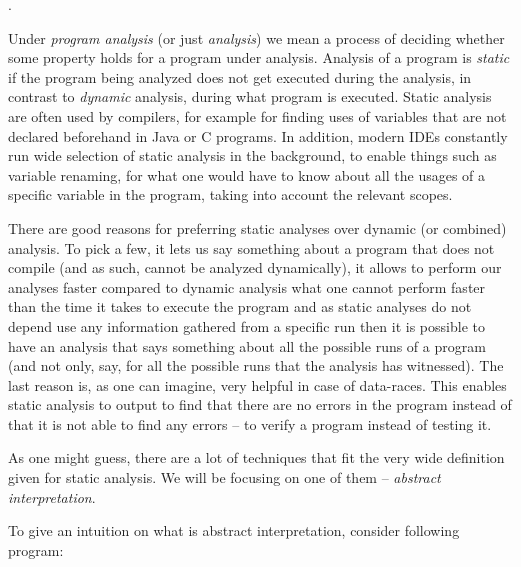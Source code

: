 \documentclass[..thesis.tex]{subfiles}
\begin{document}
.



Under \textit{program analysis} (or just \textit{analysis}) we mean a process of deciding whether some property holds for a program under analysis.
Analysis of a program is \textit{static} if the program being analyzed does not get executed during the analysis, in contrast to \textit{dynamic} analysis,
during what program is executed. Static analysis are often used by compilers, for example for finding uses of variables that are not declared beforehand
in Java or C programs. In addition, modern IDEs constantly run wide selection of static analysis in the background, to enable things such as variable renaming,
for what one would have to know about all the usages of a specific variable in the program, taking into account the relevant scopes. 



There are good reasons for preferring static analyses over dynamic (or combined) analysis.
To pick a few, it lets us say something about a program that does not compile (and as such, cannot be analyzed dynamically),
it allows to perform our analyses faster compared to dynamic analysis what one cannot perform faster than the time it takes to execute the program
and as static analyses do not depend use any information gathered from a specific run then it is possible to have an analysis that says something
about all the possible runs of a program (and not only, say, for all the possible runs that the analysis has witnessed).
The last reason is, as one can imagine, very helpful in case of data-races. This enables static analysis to output to find that there
 are no errors in the program instead of that it is not able to find any errors -- to verify a program instead of testing it.



As one might guess, there are a lot of techniques that fit the very wide definition given for static analysis. We will be focusing on one of them -- \textit{abstract interpretation}.



To give an intuition on what is abstract interpretation, consider following program:
\end{document}
